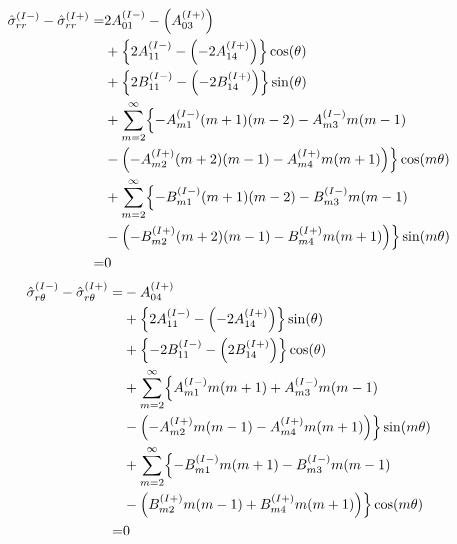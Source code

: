 \begin{align}
	\hat{\sigma}_{rr}^{(I-)}-\hat{\sigma}_{rr}^{(I+)} =
	&2A_{01}^{(I-)}-\Bigl(A_{03}^{(I+)}\Bigr)
	\nonumber
	\\
	&+\Bigl\{2A_{11}^{(I-)}
	-\Bigl(-2A_{14}^{(I+)}\Bigr)\Bigr\}\cos(\theta)
	\nonumber
	\\
	&+\Bigl\{2B_{11}^{(I-)}
	-\Bigl(-2B_{14}^{(I+)}\Bigr)\Bigr\}\sin(\theta)
	\nonumber
	\\
	&+\sum_{m=2}^{\infty}\Bigl\{
	-A_{m1}^{(I-)}(m+1)(m-2)-A_{m3}^{(I-)}m(m-1)
	\nonumber
	\\
	&-\Bigl(-A_{m2}^{(I+)}(m+2)(m-1)-A_{m4}^{(I+)}m(m+1)\Bigr)
	\Bigr\}\cos(m\theta)
	\nonumber
	\\
	&+\sum_{m=2}^{\infty}\Bigl\{
	-B_{m1}^{(I-)}(m+1)(m-2)-B_{m3}^{(I-)}m(m-1)
	\nonumber
	\\
	&-\Bigl(-B_{m2}^{(I+)}(m+2)(m-1)-B_{m4}^{(I+)}m(m+1)\Bigr)
	\Bigr\}\sin(m\theta)
	\nonumber
	\\
	=&0
	\label{eq:SigmaRReq}
\end{align}
\begin{align}
	\hat{\sigma}_{r\theta}^{(I-)}-\hat{\sigma}_{r\theta}^{(I+)} =
	&-A_{04}^{(I+)}
	\nonumber
	\\
	&+\Bigl\{2A_{11}^{(I-)}
	-\Bigl(-2A_{14}^{(I+)}\Bigr)\Bigr\}\sin(\theta)
	\nonumber
	\\
	&+\Bigl\{-2B_{11}^{(I-)}
	-\Bigl(2B_{14}^{(I+)}\Bigr)\Bigr\}\cos(\theta)
	\nonumber
	\\
	&+\sum_{m=2}^{\infty}\Bigl\{
 	A_{m1}^{(I-)}m(m+1)+A_{m3}^{(I-)}m(m-1)
	\nonumber
	\\
	&-\Bigl(-A_{m2}^{(I+)}m(m-1)-A_{m4}^{(I+)}m(m+1)\Bigr)
	\Bigr\}\sin(m\theta)
	\nonumber
	\\
	&+\sum_{m=2}^{\infty}\Bigl\{
	-B_{m1}^{(I-)}m(m+1)-B_{m3}^{(I-)}m(m-1)
	\nonumber
	\\
	&-\Bigl(B_{m2}^{(I+)}m(m-1)+B_{m4}^{(I+)}m(m+1)\Bigr)
	\Bigr\}\cos(m\theta)
	\nonumber
	\\
	=&0
	\label{eq:SigmaRTh1eq}
\end{align}

\newpage